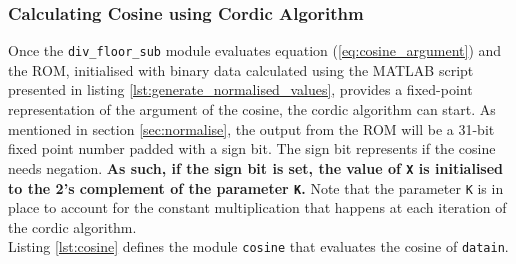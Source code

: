 \documentclass{article}
\begin{document}
\subsubsection{Calculating Cosine using Cordic Algorithm}\label{sec:cosine}

Once the {\tt div\_floor\_sub} module evaluates equation (\ref{eq:cosine_argument}) and the ROM, initialised with binary data calculated using the MATLAB script presented in listing \ref{lst:generate_normalised_values}, provides a fixed-point representation of the argument of the cosine, the cordic algorithm can start. As mentioned in section \ref{sec:normalise}, the output from the ROM will be a 31-bit fixed point number padded with a sign bit. The sign bit represents if the cosine needs negation. \textbf{As such, if the sign bit is set, the value of {\tt X} is initialised to the 2's complement of the parameter {\tt K}.} Note that the parameter {\tt K} is in place to account for the constant multiplication that happens at each iteration of the cordic algorithm.\\

Listing \ref{lst:cosine} defines the module {\tt cosine} that evaluates the cosine of {\tt datain}. 
\end{document}
